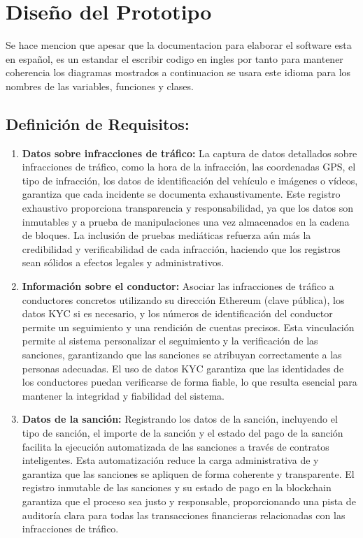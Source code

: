 \section{Diseño del Prototipo }

Se hace mencion que apesar que la documentacion para elaborar el software esta en español, es un estandar el escribir codigo en ingles por tanto para mantener coherencia los diagramas mostrados a continuacion se usara este idioma para los nombres de las variables, funciones y clases.
\subsection{Definición de Requisitos:  }
    
\begin{enumerate}
    \item \textbf{Datos sobre infracciones de tráfico:} La captura de datos detallados sobre infracciones de tráfico, como la hora de la infracción, las coordenadas GPS, el tipo de infracción, los datos de identificación del vehículo e imágenes o vídeos, garantiza que cada incidente se documenta exhaustivamente. Este registro exhaustivo proporciona transparencia y responsabilidad, ya que los datos son inmutables y a prueba de manipulaciones una vez almacenados en la cadena de bloques. La inclusión de pruebas mediáticas refuerza aún más la credibilidad y verificabilidad de cada infracción, haciendo que los registros sean sólidos a efectos legales y administrativos. 
    \item \textbf{Información sobre el conductor:} Asociar las infracciones de tráfico a conductores concretos utilizando su dirección Ethereum (clave pública), los datos KYC si es necesario, y los números de identificación del conductor permite un seguimiento y una rendición de cuentas precisos. Esta vinculación permite al sistema personalizar el seguimiento y la verificación de las sanciones, garantizando que las sanciones se atribuyan correctamente a las personas adecuadas. El uso de datos KYC garantiza que las identidades de los conductores puedan verificarse de forma fiable, lo que resulta esencial para mantener la integridad y fiabilidad del sistema.
    \item \textbf{Datos de la sanción: }  Registrando los datos de la sanción, incluyendo el tipo de sanción, el importe de la sanción y el estado del pago de la sanción facilita la ejecución automatizada de las sanciones a través de contratos inteligentes. Esta automatización reduce la carga administrativa de y garantiza que las sanciones se apliquen de forma coherente y transparente. El registro inmutable de las sanciones y su estado de pago en la blockchain garantiza que el proceso sea justo y responsable, proporcionando una pista de auditoría clara para todas las transacciones financieras relacionadas con las infracciones de tráfico.

\end{enumerate}
